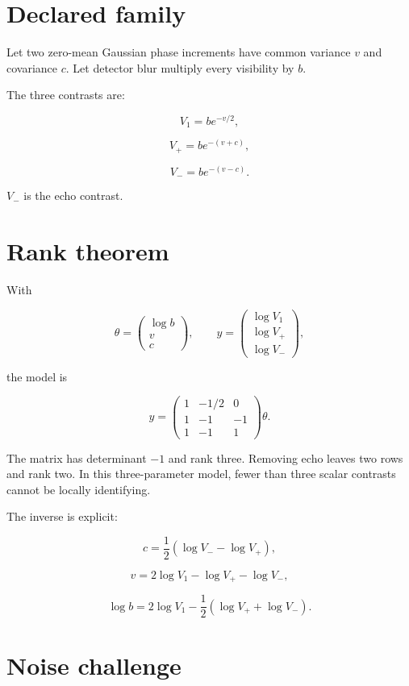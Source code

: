 \documentclass[11pt,a4paper,openany]{report}
\begin{document}
\section{Declared family}

Let two zero-mean Gaussian phase increments have common variance \(v\) and covariance \(c\). Let detector blur multiply every visibility by \(b\).

The three contrasts are:

\[
V_1=be^{-v/2},
\]

\[
V_+=be^{-(v+c)},
\]

\[
V_-=be^{-(v-c)}.
\]

\(V_-\) is the echo contrast.

\section{Rank theorem}

With

\[
\theta=
\begin{pmatrix}
\log b\\v\\c
\end{pmatrix},
\qquad
y=
\begin{pmatrix}
\log V_1\\
\log V_+\\
\log V_-
\end{pmatrix},
\]

the model is

\[
y=
\begin{pmatrix}
1&-1/2&0\\
1&-1&-1\\
1&-1&1
\end{pmatrix}
\theta.
\]

The matrix has determinant \(-1\) and rank three. Removing echo leaves two rows and rank two. In this three-parameter model, fewer than three scalar contrasts cannot be locally identifying.

The inverse is explicit:

\[
c
=
\frac12(\log V_--\log V_+),
\]

\[
v
=
2\log V_1-\log V_+-\log V_-,
\]

\[
\log b
=
2\log V_1
-\frac12(\log V_++\log V_-).
\]

\section{Noise challenge}
\end{document}
